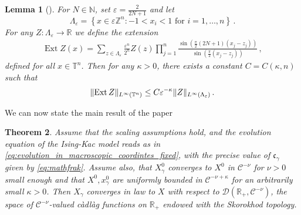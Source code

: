 \documentclass{report}
\newcommand{\ZZ}{\mathbb{Z}}
\newcommand{\NN}{\mathbb{N}}
\newcommand{\RR}{\mathbb{R}}
\newcommand{\TT}{\mathbb{T}}
\DeclarePairedDelimiter\norm{\lVert}{\rVert}%
\DeclareMathOperator{\Ext}{Ext}
\newtheorem{theorem}{Theorem}[chapter]
\newtheorem{lemma}[theorem]{Lemma}
\theoremstyle{remark}
\theoremstyle{definition}
\let\epsilon\varepsilon
\begin{document}
\begin{lemma}[{\cite[Lemma A.6]{mourrat2015convergencetwodimensionaldynamicisingkac}}]
  \label{lemma:A6}
  For $N \in \NN$, set $\epsilon = \frac{2}{2N + 1}$ and let $$\Lambda_\epsilon = \left\{x \in \epsilon \ZZ^n: -1 < x_i < 1 \text{ for } i = 1, \ldots, n\right\}\,.$$ For any $Z: \Lambda_\epsilon \to \RR$ we define the extension\begin{align*}
    \Ext{Z}(x) = \sum_{z \in \Lambda_\epsilon}\frac{\epsilon^n}{2^n}Z(z) \prod_{j=1}^n \frac{\sin\left(\frac{\pi}{2}(2N + 1)(x_j - z_j)\right)}{\sin(\frac{\pi}{2}(x_j - z_j))}\,,
  \end{align*}
  defined for all $x \in \TT^n$. Then for any $\kappa > 0$, there exists a constant $C = C(\kappa, n)$ such that
  \begin{align*}
    \norm{\Ext{Z}}_{L^\infty(\TT^n)} \le C \epsilon^{-\kappa} \norm{Z}_{L^\infty(\Lambda_\epsilon)}\,.
  \end{align*}
\end{lemma}
We can now state the main result of the paper

\begin{theorem}
  Assume that the scaling assumptions hold, and the evolution equation of the Ising-Kac model reads as in \eqref{eq:evolution_in_macroscopic_coordintes_fixed}, with the precise value of $\mathfrak{c}_\gamma$ given by \eqref{eq:mathfrak}. Assume also, that $X^0_\gamma$ converges to $X^0$ in $\mathcal{C}^{-\nu}$ for $\nu > 0$ small enough and that $X^0, x^0_\gamma$ are uniformly bounded in $\mathcal{C}^{-\nu + \kappa}$ for an arbitrarily small $\kappa > 0$. Then $X_\gamma$ converges in law to $X$ with respect to $\mathcal{D}(\RR_+, \mathcal{C}^{-\nu})$, the space of $\mathcal{C}^{-\nu}$-valued càdlàg functions on $\RR_+$ endowed with the Skorokhod topology.
\end{theorem}
\end{document}

